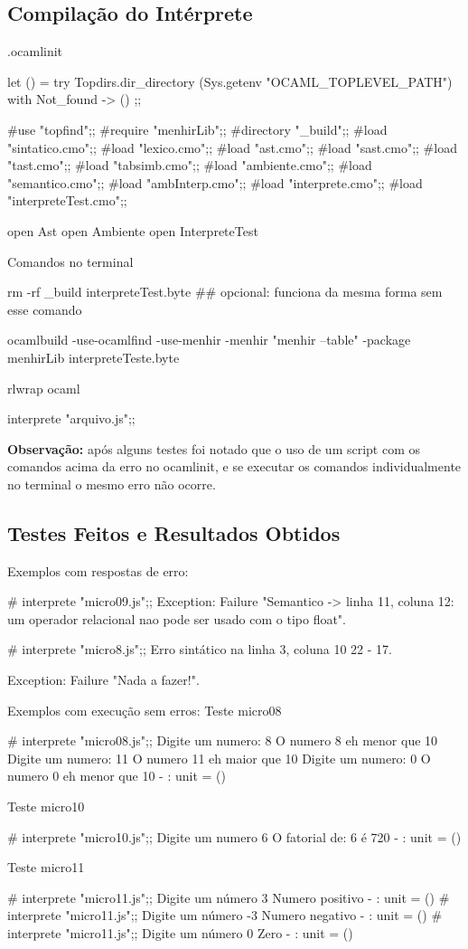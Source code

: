 \documentclass[12pt,a4paper,twoside]{article}
\begin{document}
\subsection{Compilação do Intérprete}
.ocamlinit
\begin{terminal}
let () =
  try Topdirs.dir_directory (Sys.getenv "OCAML_TOPLEVEL_PATH")
  with Not_found -> ()
;;

#use "topfind";;
#require "menhirLib";;
#directory "_build";;
#load "sintatico.cmo";;
#load "lexico.cmo";;
#load "ast.cmo";;
#load "sast.cmo";;
#load "tast.cmo";;
#load "tabsimb.cmo";;
#load "ambiente.cmo";;
#load "semantico.cmo";;
#load "ambInterp.cmo";;
#load "interprete.cmo";;
#load "interpreteTest.cmo";;

open Ast
open Ambiente
open InterpreteTest
\end{terminal}
Comandos no terminal
\begin{terminal}
rm -rf  _build  interpreteTest.byte 
## opcional: funciona da mesma forma sem esse comando

ocamlbuild -use-ocamlfind -use-menhir -menhir "menhir --table" -package menhirLib interpreteTeste.byte

rlwrap ocaml

interprete "arquivo.js";;
\end{terminal}
\textbf{Observação: } após alguns testes foi notado que o uso de um script com os comandos acima da erro no ocamlinit, e se executar os comandos individualmente no terminal o mesmo erro não ocorre.

\subsection{Testes Feitos e Resultados Obtidos}
Exemplos com respostas de erro:
\begin{terminal}
# interprete "micro09.js";;
Exception:
Failure
 "Semantico -> linha 11, coluna 12: um operador relacional nao pode ser usado com o tipo float".


# interprete "micro8.js";;
Erro sintático na linha 3, coluna 10 22 - 17.

Exception: Failure "Nada a fazer!\n".

\end{terminal}
Exemplos com execução sem erros: \newline\newline
Teste micro08
\begin{terminal}
# interprete "micro08.js";;
Digite um numero:  
8
O numero 8 eh menor que 10 
Digite um numero:  
11
O numero 11 eh maior que 10 
Digite um numero:  
0
O numero 0 eh menor que 10 
- : unit = ()
\end{terminal}
Teste micro10
\begin{terminal}
# interprete "micro10.js";;
Digite um numero 
6
O fatorial de:  6  é 720 
- : unit = ()
\end{terminal}
Teste micro11
\begin{terminal}
# interprete "micro11.js";;
Digite um número 
3
Numero positivo 
- : unit = ()
# interprete "micro11.js";;
Digite um número 
-3
Numero negativo 
- : unit = ()
# interprete "micro11.js";;
Digite um número 
0
Zero 
- : unit = ()
\end{terminal}
\end{document}
